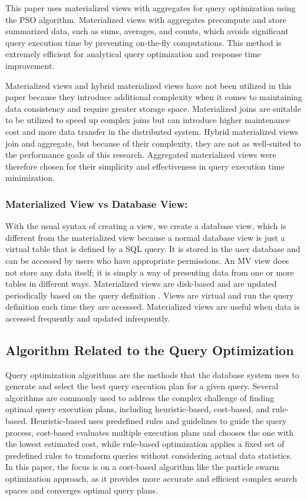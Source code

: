 This paper uses materialized views with aggregates for query optimization using the PSO algorithm. Materialized views with aggregates precompute and store summarized data, such as sums, averages, and counts, which avoids significant query execution time by preventing on-the-fly computations. This method is extremely efficient for analytical query optimization and response time improvement.

Materialized views and hybrid materialized views have not been utilized in this paper because they introduce additional complexity when it comes to maintaining data consistency and require greater storage space. Materialized joins are suitable to be utilized to speed up complex joins but can introduce higher maintenance cost and more data transfer in the distributed system. Hybrid materialized views join and aggregate, but because of their complexity, they are not as well-suited to the performance goals of this research. Aggregated materialized views were therefore chosen for their simplicity and effectiveness in query execution time minimization.

\subsubsection{Materialized View vs Database View:} With the usual syntax of creating a view, we create a database view, which is different from the materialized view because a normal database view is just a virtual table that is defined by a SQL query. It is stored in the user database and can be accessed by users who have appropriate permissions. An MV view does not store any data itself; it is simply a way of presenting data from one or more tables in different ways. Materialized views are disk-based and are updated periodically based on the query definition \cite{Stackoverflow-author-08-2008}. Views are virtual and run the query definition each time they are accessed. Materialized views are useful when data is accessed frequently and updated infrequently.

\subsection{Algorithm Related to the Query Optimization }
Query optimization algorithms are the methods that the database system uses to generate and select the best query execution plan for a given query. Several algorithms are commonly used to address the complex challenge of finding optimal query execution plans, including heuristic-based, cost-based, and rule-based. Heuristic-based uses predefined rules and guidelines to guide the query process, cost-based evaluates multiple execution plans and chooses the one with the lowest estimated cost, while rule-based optimization applies a fixed set of predefined rules to transform queries without considering actual data statistics. In this paper, the focus is on a cost-based algorithm like the particle swarm optimization approach, as it provides more accurate and efficient complex search spaces and converges optimal query plans.

